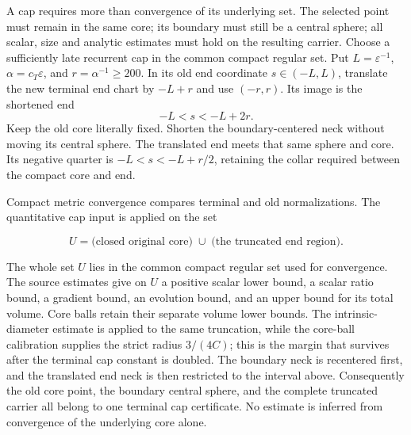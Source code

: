 A cap requires more than convergence of its underlying set. The selected
point must remain in the same core; its boundary must still be a central
sphere; all scalar, size and analytic estimates must hold on the resulting
carrier. Choose a sufficiently late recurrent cap in the common compact
regular set. Put $L=\varepsilon^{-1}$, $\alpha=c_T\varepsilon$, and
$r=\alpha^{-1}\geq200$. In its old end coordinate $s\in(-L,L)$,
translate the new terminal end chart by $-L+r$ and use $(-r,r)$.
Its image is the shortened end
\[
                         -L<s<-L+2r.
\]
Keep the old core literally fixed. Shorten the boundary-centered neck
without moving its central sphere. The translated end meets that same
sphere and core. Its negative quarter is $-L<s<-L+r/2$, retaining the
collar required between the compact core and end.

Compact metric convergence compares terminal and old normalizations. The
quantitative cap input is applied on the set

\[
 U=\text{(closed original core)}\;\cup\;
   \text{(the truncated end region)}.
\]

The whole set $U$ lies in the common compact regular set used for convergence.
The source estimates give on $U$ a positive
scalar lower bound, a scalar ratio bound, a gradient bound, an evolution bound,
and an upper bound for its total volume. Core balls retain their separate
volume lower bounds. The intrinsic-diameter estimate is applied to the
same truncation, while the core-ball calibration supplies the strict radius
$3/(4C)$; this is the margin that survives after the terminal cap constant is
doubled. The boundary neck is recentered first, and the translated end neck
is then restricted to the interval above. Consequently the old core point,
the boundary central sphere, and the complete truncated carrier all belong to
one terminal cap certificate. No estimate is inferred from convergence of the
underlying core alone.

